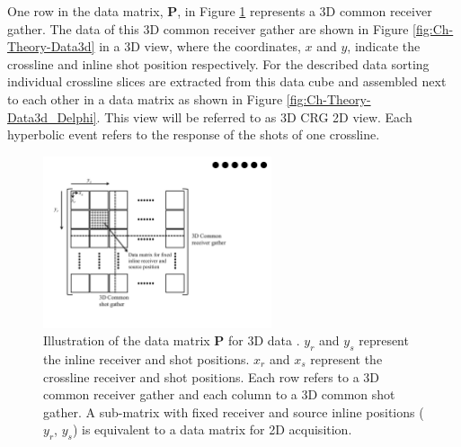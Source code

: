 One row in the data matrix, $\mathbf{P}$, in Figure \ref{fig:Ch-Theory-DelphiFormat} represents  a 3D common receiver gather. The data of this 3D common receiver gather are shown in Figure \ref{fig:Ch-Theory-Data3d} in a 3D view, where the coordinates, $x$ and $y$, indicate the crossline and inline shot position respectively. For the described data sorting individual crossline slices are extracted from this data cube and assembled next to each other in a data matrix as shown in Figure \ref{fig:Ch-Theory-Data3d_Delphi}. This view will be referred to as 3D CRG 2D view. Each hyperbolic event refers to the response of the shots of one crossline.

\begin{figure}
	\centering
	\includegraphics[width=0.6\textwidth]{Plots/DelphiFormat-v2}
	\caption{Illustration of the data matrix $\mathbf{P}$ for 3D data \citep{Delphi-Format}. $y_r$ and $y_s$ represent the inline receiver and shot positions. $x_r$ and $x_s$ represent the crossline receiver and shot positions. Each row refers to a 3D common receiver gather and each column to a 3D common shot gather. A sub-matrix with fixed receiver and source inline positions ($y_r$, $y_s$) is equivalent to a data matrix for 2D acquisition.}
	\label{fig:Ch-Theory-DelphiFormat}
\end{figure}


